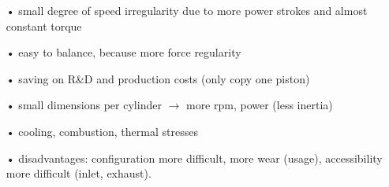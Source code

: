 			\begin{itemize}
				\item[•] small degree of speed irregularity due to more power strokes and almost constant torque
				\item[•] easy to balance, because more force regularity
				\item[•] saving on R\&D and production costs (only copy one piston)
				\item[•] small dimensions per cylinder $\rightarrow$ more rpm, power (less inertia)
				\item[•] cooling, combustion, thermal stresses
				\item[•] disadvantages: configuration more difficult, more wear (usage), accessibility more difficult (inlet, exhaust).
			\end{itemize}
			
